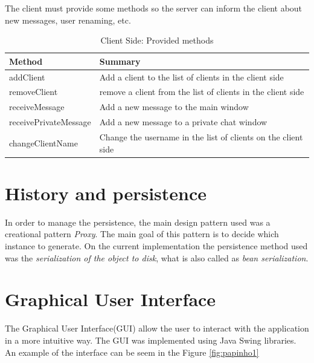 \documentclass[8pt,a4paper]{article}
\begin{document}
The client must provide some methods so the server can inform the client about new messages, user renaming, etc.  
  \begin{table}[H]
  \begin{center}
      \begin{tabular}{ | l | p{5cm} |}
      \hline
      Method & Summary \\ \hline
      addClient & Add a client to the list of clients in the client side \\ \hline 
      removeClient & remove a client from the list of clients in the client side \\ \hline
      receiveMessage & Add a new message to the main window \\ \hline
      receivePrivateMessage &  Add a new message to a private chat window \\ \hline
      changeClientName & Change the username in the list of clients on the client side \\ \hline
      \end{tabular}
  \end{center}
  \caption{Client Side: Provided methods}
  \label{tab:clientprovide}
  \end{table}

\section{History and persistence}

In order to manage the persistence, the main design pattern used was a creational pattern {\it Proxy}. The main goal of this pattern is to decide which instance to generate.
On the current implementation the persistence method used was the {\it serialization of the object to disk}, what is also called as {\it bean serialization}. 

\section{Graphical User Interface}

The Graphical User Interface(GUI) allow the user to interact with the application in a more intuitive way. 
The GUI was implemented using Java Swing libraries. An example of the interface can be seem in the Figure \ref{fig:papinho1}
\end{document}
